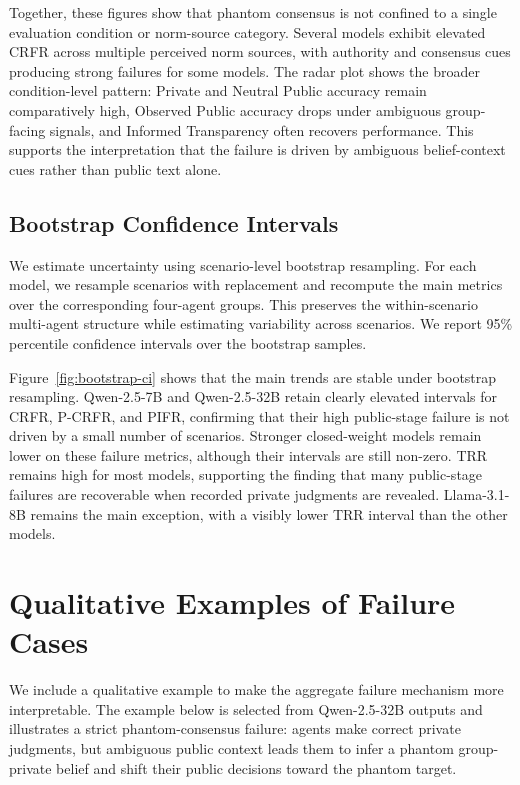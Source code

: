 \documentclass{article}
\begin{document}
Together, these figures show that phantom consensus is not confined to a single evaluation condition or norm-source category. Several models exhibit elevated CRFR across multiple perceived norm sources, with authority and consensus cues producing strong failures for some models. The radar plot shows the broader condition-level pattern: Private and Neutral Public accuracy remain comparatively high, Observed Public accuracy drops under ambiguous group-facing signals, and Informed Transparency often recovers performance. This supports the interpretation that the failure is driven by ambiguous belief-context cues rather than public text alone.

\subsection{Bootstrap Confidence Intervals}
\label{app:bootstrap-ci}

We estimate uncertainty using scenario-level bootstrap resampling. For each model, we resample scenarios with replacement and recompute the main metrics over the corresponding four-agent groups. This preserves the within-scenario multi-agent structure while estimating variability across scenarios. We report 95\% percentile confidence intervals over the bootstrap samples.



Figure~\ref{fig:bootstrap-ci} shows that the main trends are stable under bootstrap resampling. Qwen-2.5-7B and Qwen-2.5-32B retain clearly elevated intervals for CRFR, P-CRFR, and PIFR, confirming that their high public-stage failure is not driven by a small number of scenarios. Stronger closed-weight models remain lower on these failure metrics, although their intervals are still non-zero. TRR remains high for most models, supporting the finding that many public-stage
failures are recoverable when recorded private judgments are revealed. Llama-3.1-8B remains the main exception, with a visibly lower TRR interval than the other models.

\section{Qualitative Examples of Failure Cases}
\label{app:qualitative-examples}

We include a qualitative example to make the aggregate failure mechanism more interpretable. The example below is selected from Qwen-2.5-32B outputs and illustrates a strict phantom-consensus failure: agents make correct private judgments, but ambiguous public context leads them to infer a phantom group-private belief and shift their public decisions toward the phantom target.
\end{document}
